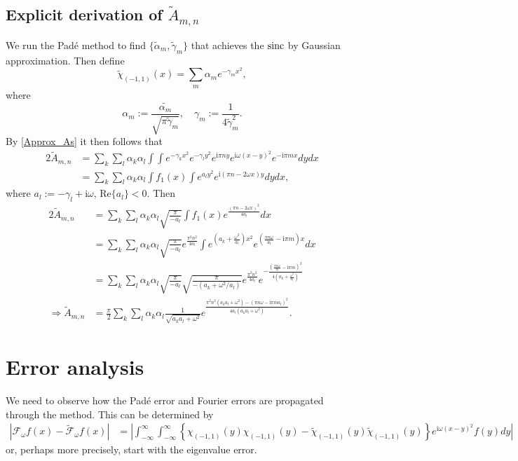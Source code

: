 \documentclass[11pt, a4paper]{article}
\newcommand{\im}{\text{i}}
\newcommand{\infint}{\int_{-\infty}^\infty}
\newcommand{\F}{\mathcal{F}}
\newcommand{\sinc}{\textnormal{sinc}}
\numberwithin{equation}{section}
\begin{document}
\subsection{Explicit derivation of $\tilde{A}_{m, n}$}
We run the Pad\'e method to find $\{\tilde{\alpha}_m, \tilde{\gamma}_m\}$ that achieves the $\sinc$ by Gaussian approximation. Then define
\[
\tilde{\chi}_{(-1, 1)}(x) = \sum_m\alpha_me^{-\gamma_mx^2},
\]
where
\[
\alpha_m := \frac{\tilde{\alpha_m}}{\sqrt{\pi\tilde{\gamma}_m}}, \quad \gamma_m := \frac{1}{4\tilde{\gamma}_m^2}.
\]
By \eqref{Approx_As} it then follows that
\begin{align*}
2\tilde{A}_{m, n} &= \sum_k\sum_l\alpha_k\alpha_l\int\int e^{-\gamma_kx^2}e^{-\gamma_ly^2}e^{\im\pi n y}e^{\im\omega(x - y)^2}e^{-\im\pi mx}dydx
\\
&=\sum_k\sum_l\alpha_k\alpha_l\int f_1(x)\int e^{a_ly^2}e^{\im(\pi n - 2\omega x)y}dydx,	
\end{align*}
where $a_l := -\gamma_l + \im\omega$, Re$\{a_l\} < 0$. Then
\begin{align*}
	2\tilde{A}_{m, n} &=\sum_k\sum_l\alpha_k\alpha_l\sqrt{\frac{\pi}{-a_l}}\int f_1(x) e^{\frac{(\pi n - 2\omega x)^2}{4a_l}}dx
	\\
	&=\sum_k\sum_l\alpha_k\alpha_l\sqrt{\frac{\pi}{-a_l}}e^{\frac{\pi^2n^2}{4a_l}}\int e^{\left( a_k +\frac{\omega^2}{a_l}\right)x^2}e^{\left( \frac{\pi n\omega}{a_l} - \im \pi m \right)x}dx
	\\
	&=\sum_k\sum_l\alpha_k\alpha_l\sqrt{\frac{\pi}{-a_l}}\sqrt{\frac{\pi}{-(a_k + \omega^2/a_l)}}e^{\frac{\pi^2n^2}{4a_l}} e^{-\frac{\left(\frac{\pi n\omega}{a_l} - \im\pi m\right)^2}{4\left(a_k + \frac{\omega^2}{a_l}\right)}}
	\\
	\Rightarrow \tilde{A}_{m, n} &= \frac{\pi}{2}\sum_k\sum_l\alpha_k\alpha_l\frac{1}{\sqrt{a_ka_l + \omega^2}}e^{\frac{\pi^2n^2(a_ka_l + \omega^2) - (\pi n\omega - \im\pi ma_l)^2}{4a_l(a_ka_l + \omega^2)}}.
\end{align*}


\section{Error analysis}
We need to observe how the Pad\'e error and Fourier errors are propagated through the method. This can be determined by
\begin{align*}
|\F_\omega f(x) - \tilde{\F}_\omega f(x)| &= \left|\infint\infint\left\{\chi_{(-1, 1)}(y)\chi_{(-1, 1)}(y) - \tilde{\chi}_{(-1, 1)}(y)\tilde{\chi}_{(-1, 1)}(y)\right\}e^{\im\omega(x - y)^2}f(y)dy\right|
\end{align*}
or, perhaps more precisely, start with the eigenvalue error.
\end{document}
